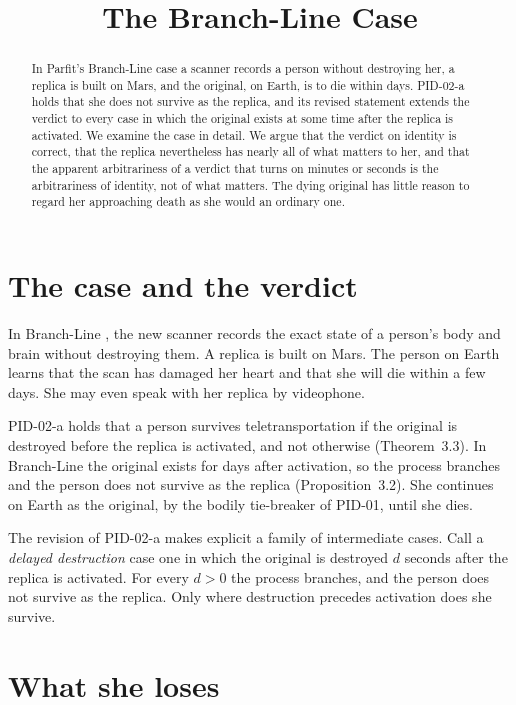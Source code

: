 \documentclass{situationist-preprint}
\title{The Branch-Line Case}
\begin{document}
\maketitle

\begin{abstract}
In Parfit's Branch-Line case a scanner records a person without destroying her, a replica is built on Mars, and the original, on Earth, is to die within days. PID-02-a holds that she does not survive as the replica, and its revised statement extends the verdict to every case in which the original exists at some time after the replica is activated. We examine the case in detail. We argue that the verdict on identity is correct, that the replica nevertheless has nearly all of what matters to her, and that the apparent arbitrariness of a verdict that turns on minutes or seconds is the arbitrariness of identity, not of what matters. The dying original has little reason to regard her approaching death as she would an ordinary one.
\end{abstract}

\section{The case and the verdict}

In Branch-Line \citep[ch.~10]{Parfit1984}, the new scanner records the exact state of a person's body and brain without destroying them. A replica is built on Mars. The person on Earth learns that the scan has damaged her heart and that she will die within a few days. She may even speak with her replica by videophone.

PID-02-a holds that a person survives teletransportation if the original is destroyed before the replica is activated, and not otherwise (Theorem~3.3). In Branch-Line the original exists for days after activation, so the process branches and the person does not survive as the replica (Proposition~3.2). She continues on Earth as the original, by the bodily tie-breaker of PID-01, until she dies.

The revision of PID-02-a makes explicit a family of intermediate cases. Call a \emph{delayed destruction} case one in which the original is destroyed $d$ seconds after the replica is activated. For every $d>0$ the process branches, and the person does not survive as the replica. Only where destruction precedes activation does she survive.

\section{What she loses}
\end{document}
